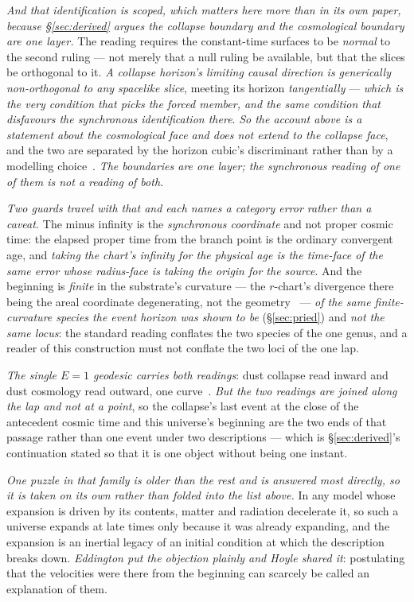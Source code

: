 \documentclass[11pt,a4paper]{article}
\theoremstyle{plain}
\theoremstyle{definition}
\begin{document}
\emph{And that identification is scoped, which matters here more than in its own paper, because
\S\ref{sec:derived} argues the collapse boundary and the cosmological boundary are one layer.} The reading
requires the constant-time surfaces to be \emph{normal} to the second ruling --- not merely that a null
ruling be available, but that the slices be orthogonal to it. \emph{A collapse horizon's limiting causal
direction is generically non-orthogonal to any spacelike slice}, meeting its horizon \emph{tangentially} ---
\emph{which is the very condition that picks the forced member, and the same condition that disfavours the
synchronous identification there}. \emph{So the account above is a statement about the cosmological face and
does not extend to the collapse face}, and the two are separated by the horizon cubic's discriminant rather
than by a modelling choice~\cite{JanzenOperator}. \emph{The boundaries are one layer; the synchronous reading
of one of them is not a reading of both.}

\emph{Two guards travel with that and each names a category error rather than a caveat.} The minus infinity
is the \emph{synchronous coordinate} and not proper cosmic time: the elapsed proper time from the branch point is
the ordinary convergent age, and \emph{taking the chart's infinity for the physical age is the time-face of the
same error whose radius-face is taking the origin for the source}. And the beginning is \emph{finite}
in the substrate's curvature --- the $r$-chart's divergence there being the areal coordinate degenerating, not
the geometry~\cite{JanzenOperator} --- \emph{of the same finite-curvature species the event horizon was shown to
be} (\S\ref{sec:pried}) and \emph{not the same locus}: the standard reading conflates the two species of the
one genus, and a reader of this construction must not conflate the two loci of the one lap.

\emph{The single $E=1$ geodesic carries both readings}: dust collapse read inward and dust cosmology read
outward, one curve~\cite{JanzenOperator}. \emph{But the two readings are joined along the lap and not at a
point}, so the collapse's last event at the close of the antecedent cosmic time and this universe's beginning
are the two ends of that passage rather than one event under two descriptions --- which is
\S\ref{sec:derived}'s continuation stated so that it is one object without being one instant.

\emph{One puzzle in that family is older than the rest and is answered most directly, so it is taken on its
own rather than folded into the list above.} In any model whose expansion is driven by its contents, matter and radiation
decelerate it, so such a universe expands at late times only because it was already expanding, and the
expansion is an inertial legacy of an initial condition at which the description breaks down. \emph{Eddington
put the objection plainly and Hoyle shared it}: postulating that the velocities were there from the beginning
can scarcely be called an explanation of them.
\end{document}
